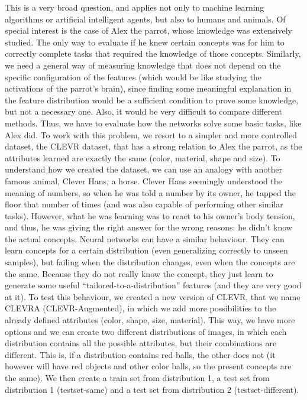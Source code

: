 This is a very broad question, and applies not only to machine learning algorithms or artificial intelligent agents, but also to humans and animals. Of special interest is the case of Alex the parrot, whose knowledge was extensively studied. The only way to evaluate if he knew certain concepts was for him to correctly complete tasks that required the knowledge of those concepts.
Similarly, we need a general way of measuring knowledge that does not depend on the specific configuration of the features (which would be like studying the activations of the parrot’s brain), since finding some meaningful explanation in the feature distribution would be a sufficient condition to prove some knowledge, but not a necessary one. Also, it would be very difficult to compare different methods. Thus, we have to evaluate how the networks solve some basic tasks, like Alex did. 
To work with this problem, we resort to a simpler and more controlled dataset, the CLEVR dataset, that has a strong relation to Alex the parrot, as the attributes learned are exactly the same (color, material, shape and size).
To understand how we created the dataset, we can use an analogy with another famous animal, Clever Hans, a horse. Clever Hans seemingly understood the meaning of numbers, so when he was told a number by its owner, he tapped the floor that number of times (and was also capable of performing other similar tasks). However, what he was learning was to react to his owner’s body tension, and thus, he was giving the right answer for the wrong reasons: he didn’t know the actual concepts.
Neural networks can have a similar behaviour. They can learn concepts for a certain distribution (even generalizing correctly to unseen samples), but failing when the distribution changes, even when the concepts are the same. Because they do not really know the concept, they just learn to generate some useful “tailored-to-a-distribution” features (and they are very good at it).
To test this behaviour, we created a new version of CLEVR, that we name CLEVRA (CLEVR-Augmented), in which we add more possibilities to the already defined attributes (color, shape, size, material). This way, we have more options and we can create two different distributions of images, in which each distribution contains all the possible attributes, but their combinations are different. This is, if a distribution contains red balls, the other does not (it however will have red objects and other color balls, so the present concepts are the same).  We then create a train set from distribution 1, a test set from distribution 1 (testset-same) and a test set from distribution 2 (testset-different).
